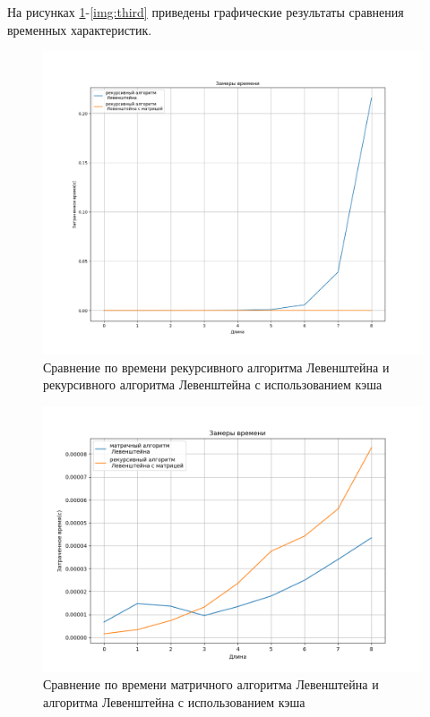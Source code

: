 На рисунках \ref{img:first}-\ref{img:third} приведены графические результаты сравнения временных характеристик.

\begin{figure}[H]
	\begin{center}
		\includegraphics[scale=0.5]{img/first.png}
	\end{center}
	\captionsetup{justification=centering}
	\caption{Сравнение по времени рекурсивного алгоритма Левенштейна и рекурсивного алгоритма Левенштейна с использованием кэша}
	\label{img:first}
\end{figure}

\begin{figure}[H]
	\begin{center}
		\includegraphics[scale=0.6]{img/second.png}
	\end{center}
	\captionsetup{justification=centering}
	\caption{Сравнение по времени матричного алгоритма Левенштейна и алгоритма Левенштейна с использованием кэша}
	\label{img:second}
\end{figure}

